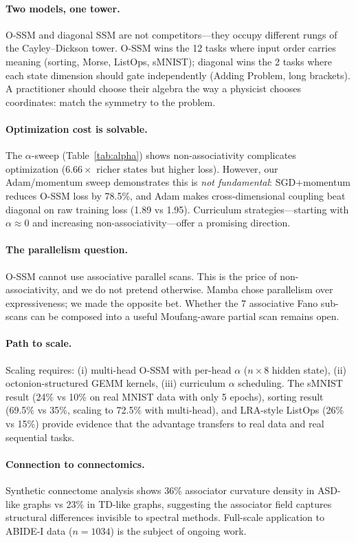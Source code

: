 \documentclass{article}
\begin{document}
\paragraph{Two models, one tower.}
O-SSM and diagonal SSM are not competitors---they occupy different rungs of the Cayley--Dickson tower.
O-SSM wins the 12 tasks where input order carries meaning (sorting, Morse, ListOps, sMNIST); diagonal wins the 2 tasks where each state dimension should gate independently (Adding Problem, long brackets).
A practitioner should choose their algebra the way a physicist chooses coordinates: match the symmetry to the problem.

\paragraph{Optimization cost is solvable.}
The $\alpha$-sweep (Table~\ref{tab:alpha}) shows non-associativity complicates optimization ($6.66\times$ richer states but higher loss).
However, our Adam/momentum sweep demonstrates this is \emph{not fundamental}: SGD+momentum reduces O-SSM loss by 78.5\%, and Adam makes cross-dimensional coupling beat diagonal on raw training loss (1.89 vs 1.95).
Curriculum strategies---starting with $\alpha \approx 0$ and increasing non-associativity---offer a promising direction.

\paragraph{The parallelism question.}
O-SSM cannot use associative parallel scans.
This is the price of non-associativity, and we do not pretend otherwise.
Mamba chose parallelism over expressiveness; we made the opposite bet.
Whether the 7 associative Fano sub-scans can be composed into a useful Moufang-aware partial scan remains open.

\paragraph{Path to scale.}
Scaling requires: (i) multi-head O-SSM with per-head $\alpha$ ($n \times 8$ hidden state), (ii) octonion-structured GEMM kernels, (iii) curriculum $\alpha$ scheduling.
The sMNIST result (24\% vs 10\% on real MNIST data with only 5 epochs), sorting result (69.5\% vs 35\%, scaling to 72.5\% with multi-head), and LRA-style ListOps (26\% vs 15\%) provide evidence that the advantage transfers to real data and real sequential tasks.

\paragraph{Connection to connectomics.}
Synthetic connectome analysis shows 36\% associator curvature density in ASD-like graphs vs 23\% in TD-like graphs, suggesting the associator field captures structural differences invisible to spectral methods.
Full-scale application to ABIDE-I data ($n=1034$) is the subject of ongoing work.
\end{document}
